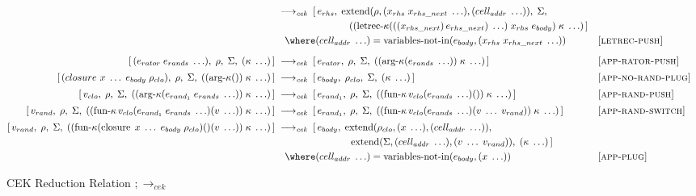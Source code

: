 \begin{figure}[!h]
{\begin{minipage}{\textwidth}
\begin{align*}
        &\;\longrightarrow_{\textit{cek}}\;
        [\,e_{rhs},\;
          \operatorname{extend}(\rho,(x_{rhs}\;x_{rhs\_next}\;\ldots),(cell_{addr}\;\ldots)),\;\Sigma,\\
        &\hspace{7.6em}
          ((\operatorname{letrec-\kappa}(((x_{rhs\_next})\,e_{rhs\_next})\;\ldots)\;x_{rhs}\;e_{body})\;\kappa\;\ldots)\,] \\
        &\hspace{1em}
          \where (cell_{addr}\;\ldots)=\operatorname{variables-not-in}(e_{body},(x_{rhs}\;x_{rhs\_next}\;\ldots))
        &&\textsc{[letrec‑push]}\\[6pt]
%
        [\,(e_{rator}\;e_{rands}\;\ldots),\;\rho,\;\Sigma,\;(\kappa\;\ldots)\,]
        &\;\longrightarrow_{\textit{cek}}\;
        [\,e_{rator},\;\rho,\;\Sigma,\;((\operatorname{arg-\kappa}(e_{rands}\;\ldots))\;\kappa\;\ldots)\,]
        &&\textsc{[app‑rator‑push]}\\[2pt]
%
        [\,(closure\ x\;\ldots\;e_{body}\;\rho_{clo}),\;\rho,\;\Sigma,\;((\operatorname{arg-\kappa}())\;\kappa\;\ldots)\,]
        &\;\longrightarrow_{\textit{cek}}\;
        [\,e_{body},\;\rho_{clo},\;\Sigma,\;(\kappa\;\ldots)\,]
        &&\textsc{[app‑no‑rand‑plug]}\\[2pt]
%
        [\,v_{clo},\;\rho,\;\Sigma,\;((\operatorname{arg-\kappa}(e_{rand_1}\;e_{rands}\;\ldots))\;\kappa\;\ldots)\,]
        &\;\longrightarrow_{\textit{cek}}\;
        [\,e_{rand_1},\;\rho,\;\Sigma,\;((\operatorname{fun-\kappa}v_{clo}(e_{rands}\;\ldots)())\;\kappa\;\ldots)\,]
        &&\textsc{[app‑rand‑push]}\\[2pt]
%
        [\,v_{rand},\;\rho,\;\Sigma,\;((\operatorname{fun-\kappa}v_{clo}(e_{rand_1}\;e_{rands}\;\ldots)(v\;\ldots))\;\kappa\;\ldots)\,]
        &\;\longrightarrow_{\textit{cek}}\;
        [\,e_{rand_1},\;\rho,\;\Sigma,\;((\operatorname{fun-\kappa}v_{clo}(e_{rands}\;\ldots)(v\;\ldots\;v_{rand}))\;\kappa\;\ldots)\,]
        &&\textsc{[app‑rand‑switch]}\\[2pt]
%
        [\,v_{rand},\;\rho,\;\Sigma,\;((\operatorname{fun-\kappa}
            (\operatorname{closure}\;x\;\ldots\;e_{body}\;\rho_{clo})() (v\;\ldots))\;\kappa\;\ldots)\,]
        &\;\longrightarrow_{\textit{cek}}\;
        [\,e_{body},\;
          \operatorname{extend}(\rho_{clo},(x\;\ldots),(cell_{addr}\;\ldots)),\\
        &\hspace{7.6em}
          \operatorname{extend}(\Sigma,(cell_{addr}\;\ldots),(v\;\ldots\;v_{rand})),\;(\kappa\;\ldots)\,] \\
        &\hspace{1em}
          \where (cell_{addr}\;\ldots)=\operatorname{variables-not-in}(e_{body},(x\;\ldots))
        &&\textsc{[app‑plug]}
      \end{align*}
    \end{minipage}%
  }
  \vspace{0.6em}
  \caption{CEK Reduction Relation $;\longrightarrow_{\textit{cek}}$}
  \label{fig:cek-reduction-relation-redacted}
\end{figure}
